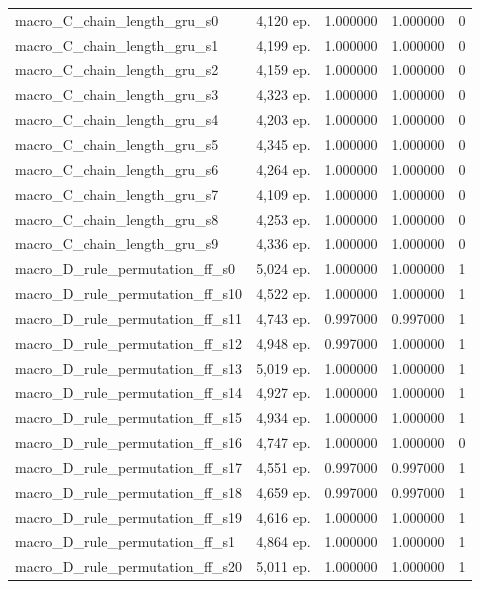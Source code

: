 \begin{tabular}{llrrr}
macro\_C\_chain\_length\_gru\_s0 & 4,120 ep. & 1.000000 & 1.000000 & 0 \\
macro\_C\_chain\_length\_gru\_s1 & 4,199 ep. & 1.000000 & 1.000000 & 0 \\
macro\_C\_chain\_length\_gru\_s2 & 4,159 ep. & 1.000000 & 1.000000 & 0 \\
macro\_C\_chain\_length\_gru\_s3 & 4,323 ep. & 1.000000 & 1.000000 & 0 \\
macro\_C\_chain\_length\_gru\_s4 & 4,203 ep. & 1.000000 & 1.000000 & 0 \\
macro\_C\_chain\_length\_gru\_s5 & 4,345 ep. & 1.000000 & 1.000000 & 0 \\
macro\_C\_chain\_length\_gru\_s6 & 4,264 ep. & 1.000000 & 1.000000 & 0 \\
macro\_C\_chain\_length\_gru\_s7 & 4,109 ep. & 1.000000 & 1.000000 & 0 \\
macro\_C\_chain\_length\_gru\_s8 & 4,253 ep. & 1.000000 & 1.000000 & 0 \\
macro\_C\_chain\_length\_gru\_s9 & 4,336 ep. & 1.000000 & 1.000000 & 0 \\
macro\_D\_rule\_permutation\_ff\_s0 & 5,024 ep. & 1.000000 & 1.000000 & 1 \\
macro\_D\_rule\_permutation\_ff\_s10 & 4,522 ep. & 1.000000 & 1.000000 & 1 \\
macro\_D\_rule\_permutation\_ff\_s11 & 4,743 ep. & 0.997000 & 0.997000 & 1 \\
macro\_D\_rule\_permutation\_ff\_s12 & 4,948 ep. & 0.997000 & 1.000000 & 1 \\
macro\_D\_rule\_permutation\_ff\_s13 & 5,019 ep. & 1.000000 & 1.000000 & 1 \\
macro\_D\_rule\_permutation\_ff\_s14 & 4,927 ep. & 1.000000 & 1.000000 & 1 \\
macro\_D\_rule\_permutation\_ff\_s15 & 4,934 ep. & 1.000000 & 1.000000 & 1 \\
macro\_D\_rule\_permutation\_ff\_s16 & 4,747 ep. & 1.000000 & 1.000000 & 0 \\
macro\_D\_rule\_permutation\_ff\_s17 & 4,551 ep. & 0.997000 & 0.997000 & 1 \\
macro\_D\_rule\_permutation\_ff\_s18 & 4,659 ep. & 0.997000 & 0.997000 & 1 \\
macro\_D\_rule\_permutation\_ff\_s19 & 4,616 ep. & 1.000000 & 1.000000 & 1 \\
macro\_D\_rule\_permutation\_ff\_s1 & 4,864 ep. & 1.000000 & 1.000000 & 1 \\
macro\_D\_rule\_permutation\_ff\_s20 & 5,011 ep. & 1.000000 & 1.000000 & 1 \\

\end{tabular}
